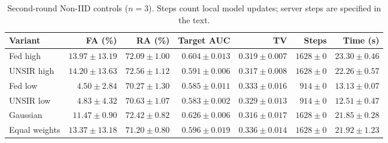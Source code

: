 \begin{table}[H]\centering\scriptsize\setlength{\tabcolsep}{4pt}
\caption{Second-round Non-IID controls ($n=3$). Steps count local model updates; server steps are specified in the text.}
\label{tab:round2-noniid}\begin{tabular}{lrrrrrr}\toprule Variant & FA (\%) & RA (\%) & Target AUC & TV & Steps & Time (s)\\\midrule
Fed high & $13.97 \pm 13.19$ & $72.09 \pm 1.00$ & $0.604 \pm 0.013$ & $0.319 \pm 0.007$ & $1628 \pm 0$ & $23.30 \pm 0.46$\\
UNSIR high & $14.20 \pm 13.63$ & $72.56 \pm 1.12$ & $0.591 \pm 0.006$ & $0.317 \pm 0.008$ & $1628 \pm 0$ & $22.26 \pm 0.57$\\
Fed low & $4.50 \pm 2.84$ & $70.27 \pm 1.30$ & $0.585 \pm 0.011$ & $0.333 \pm 0.016$ & $914 \pm 0$ & $13.13 \pm 0.07$\\
UNSIR low & $4.83 \pm 4.32$ & $70.63 \pm 1.07$ & $0.583 \pm 0.002$ & $0.329 \pm 0.013$ & $914 \pm 0$ & $12.51 \pm 0.47$\\
Gaussian & $11.47 \pm 0.90$ & $72.42 \pm 0.82$ & $0.626 \pm 0.006$ & $0.316 \pm 0.017$ & $1628 \pm 0$ & $21.85 \pm 0.28$\\
Equal weights & $13.37 \pm 13.18$ & $71.20 \pm 0.80$ & $0.596 \pm 0.019$ & $0.336 \pm 0.014$ & $1628 \pm 0$ & $21.92 \pm 1.23$\\
\bottomrule\end{tabular}\end{table}

